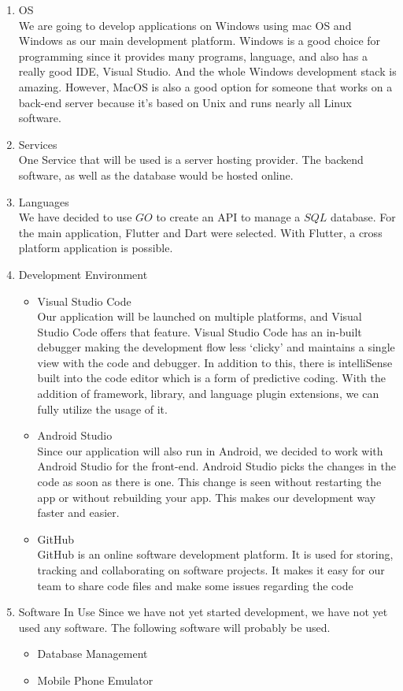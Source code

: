 \documentclass[10pt]{article}
\begin{document}
\begin{multicols}{2}
\begin{enumerate}
  \item {OS} \\
  We are going to develop applications on Windows using mac OS and Windows as our main development platform. Windows is a good choice for programming since it provides many programs, language, and also has a really good IDE, Visual Studio. And the whole Windows development stack is amazing. However, MacOS is also a good option for someone that works on a back-end server because it's based on Unix and runs nearly all Linux software.
  
  \item {Services} \\
  One Service that will be used is a server hosting provider. The backend software, as well as the database would be hosted online.
  
  \item {Languages} \\
  We have decided to use $GO$ to create an API to manage a $SQL$ database. For the main application, Flutter and Dart were selected. With Flutter, a cross platform application is possible.
  
  \item {Development Environment}
  \begin{itemize}
    \item {Visual Studio Code}\\
    Our application will be launched on multiple platforms, and Visual Studio Code offers that feature. Visual Studio Code has an in-built debugger making the development flow less ‘clicky’ and maintains a single view with the code and debugger. In addition to this, there is intelliSense built into the code editor which is a form of predictive coding. With the addition of framework, library, and language plugin extensions, we can fully utilize the usage of it.
    \item {Android Studio} \\
    Since our application will also run in Android, we decided to work with Android Studio for the front-end. Android Studio picks the changes in the code as soon as there is one. This change is seen without restarting the app or without rebuilding your app. This makes our development way faster and easier.
    \item {GitHub} \\
    GitHub is an online software development platform. It is used for storing, tracking and collaborating on software projects. It makes it easy for our team to share code files and make some issues regarding the code
  \end{itemize}
  \item {Software In Use}
  Since we have not yet started development, we have not yet used any software. The following software will probably be used.
  \begin{itemize}
    \item Database Management
    \item Mobile Phone Emulator
  \end{itemize}
\end{enumerate}



\end{multicols}
\end{document}
